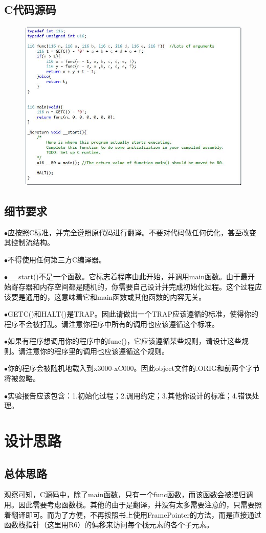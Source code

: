\documentclass[UTF8]{article}
\newcommand{\keypoint}[1]{$\bullet$\quad#1\par}
\begin{document}
\subsection{C代码源码}
\begin{figure}[H]
	\centering
	\includegraphics[scale=0.5]{C_code.jpg}
	\label{C_code}
\end{figure}\par
\subsection{细节要求}
\keypoint{应按照C标准，并完全遵照原代码进行翻译。不要对代码做任何优化，甚至改变其控制流结构。}
\keypoint{不得使用任何第三方C编译器。}
\keypoint{\_\_start()不是一个函数。它标志着程序由此开始，并调用main函数。由于最开始寄存器和内存空间都是随机的，你需要自己设计并完成初始化过程。这个过程应该要是通用的，这意味着它和main函数或其他函数的内容无关。}
\keypoint{GETC()和HALT()是TRAP。因此请做出一个TRAP应该遵循的标准，使得你的程序不会被打乱。请注意你程序中所有的调用也应该遵循这个标准。}
\keypoint{如果有程序想调用你的程序中的func()，它应该遵循某些规则，请设计这些规则。请注意你的程序里的调用也应该遵循这个规则。}
\keypoint{你的程序会被随机地载入到x3000-xC000。因此object文件的.ORIG和前两个字节将被忽略。}
\keypoint{实验报告应该包含：1.初始化过程；2.调用约定；3.其他你设计的标准；4.错误处理。}



\section{设计思路}
\subsection{总体思路}
观察可知，C源码中，除了main函数，只有一个func函数，而该函数会被递归调用。因此需要考虑函数栈。其他的由于是翻译，并没有太多需要注意的，只需要照着翻译即可。而为了方便，不再按照书上使用FramePointer的方法，而是直接通过函数栈指针（这里用R6）的偏移来访问每个栈元素的各个子元素。\par
\end{document}
